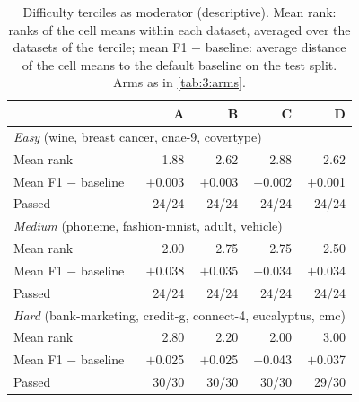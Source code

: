 \begin{table}[htbp]
  \centering
  \small
  \caption[Difficulty terciles as moderator]{Difficulty terciles as moderator (descriptive). Mean rank: ranks of the cell means within each dataset, averaged over the datasets of the tercile; mean F1 $-$ baseline: average distance of the cell means to the default baseline on the test split. Arms as in \autoref{tab:3:arms}.}
  \label{tab:6:terciles}
  \begin{tabular}{lrrrr}
    \toprule
     & A & B & C & D \\
    \midrule
    \multicolumn{5}{l}{\emph{Easy} (wine, breast cancer, cnae-9, covertype)} \\
    \quad Mean rank & 1.88 & 2.62 & 2.88 & 2.62 \\
    \quad Mean F1 $-$ baseline & $+$0.003 & $+$0.003 & $+$0.002 & $+$0.001 \\
    \quad Passed & 24/24 & 24/24 & 24/24 & 24/24 \\
    \midrule
    \multicolumn{5}{l}{\emph{Medium} (phoneme, fashion-mnist, adult, vehicle)} \\
    \quad Mean rank & 2.00 & 2.75 & 2.75 & 2.50 \\
    \quad Mean F1 $-$ baseline & $+$0.038 & $+$0.035 & $+$0.034 & $+$0.034 \\
    \quad Passed & 24/24 & 24/24 & 24/24 & 24/24 \\
    \midrule
    \multicolumn{5}{l}{\emph{Hard} (bank-marketing, credit-g, connect-4, eucalyptus, cmc)} \\
    \quad Mean rank & 2.80 & 2.20 & 2.00 & 3.00 \\
    \quad Mean F1 $-$ baseline & $+$0.025 & $+$0.025 & $+$0.043 & $+$0.037 \\
    \quad Passed & 30/30 & 30/30 & 30/30 & 29/30 \\
    \bottomrule
  \end{tabular}
\end{table}
